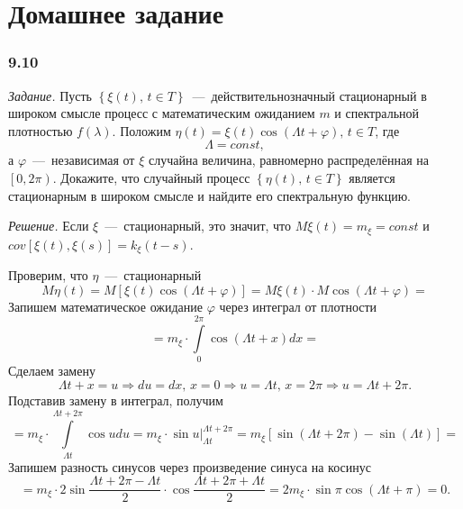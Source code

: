 \section*{Домашнее задание}

\subsubsection*{9.10}

\textit{Задание.}
Пусть $ \left\{ \xi \left( t \right), \, t \in T \right\} $~---~действительнозначный
стационарный в широком смысле процесс с математическим ожиданием $m$ и спектральной плотностью
$f \left( \lambda \right) $.
Положим
$ \eta \left( t \right) = \xi \left( t \right) \cos \left( \Lambda t + \varphi \right), \,
  t \in T$,
где
\begin{equation*}
  \Lambda =
  const,
\end{equation*}
а $\varphi$~---~независимая от $ \xi $ случайна величина,
равномерно распределённая на $ \left[ 0, 2 \pi \right) $.
Докажите, что случайный процесс $ \left\{ \eta \left( t \right), \, t \in T \right\} $
является стационарным в широком смысле и найдите его спектральную функцию.

\textit{Решение.}
Если $ \xi $~---~стационарный, это значит,
что $M \xi \left( t \right) = m_{ \xi } = const$ и
$cov \left[ \xi \left( t \right), \xi \left( s \right) \right] =
  k_{ \xi } \left( t - s \right) $.

Проверим, что $ \eta $~---~стационарный
\begin{equation*}
  M \eta \left( t \right) =
  M \left[ \xi \left( t \right) \cos \left( \Lambda t + \varphi \right) \right] =
  M \xi \left( t \right) \cdot M \cos \left( \Lambda t + \varphi \right) =
\end{equation*}
Запишем математическое ожидание $ \varphi $ через интеграл от плотности
\begin{equation*}
  = m_{ \xi } \cdot \int \limits_0^{2 \pi } \cos \left( \Lambda t + x \right) dx =
\end{equation*}
Сделаем замену
\begin{equation*}
  \Lambda t + x = u \Rightarrow du = dx, \,
  x = 0 \Rightarrow u = \Lambda t, \,
  x = 2 \pi \Rightarrow u = \Lambda t + 2 \pi.
\end{equation*}
Подставив замену в интеграл, получим
\begin{equation*}
  = m_{ \xi } \cdot \int \limits_{ \Lambda t}^{ \Lambda t + 2 \pi } \cos u du =
  m_{ \xi } \cdot \left. \sin u \right|_{ \Lambda t}^{ \Lambda t + 2 \pi } =
  m_{ \xi } \left[ \sin \left( \Lambda t + 2 \pi \right) - \sin \left( \Lambda t \right) \right] =
\end{equation*}
Запишем разность синусов через произведение синуса на косинус
\begin{equation*}
  = m_{ \xi } \cdot 2 \sin \frac{ \Lambda t + 2 \pi - \Lambda t}{2} \cdot
  \cos \frac{ \Lambda t + 2 \pi + \Lambda t}{2} =
  2m_{ \xi } \cdot \sin \pi \cos \left( \Lambda t + \pi \right) =
  0.
\end{equation*}

